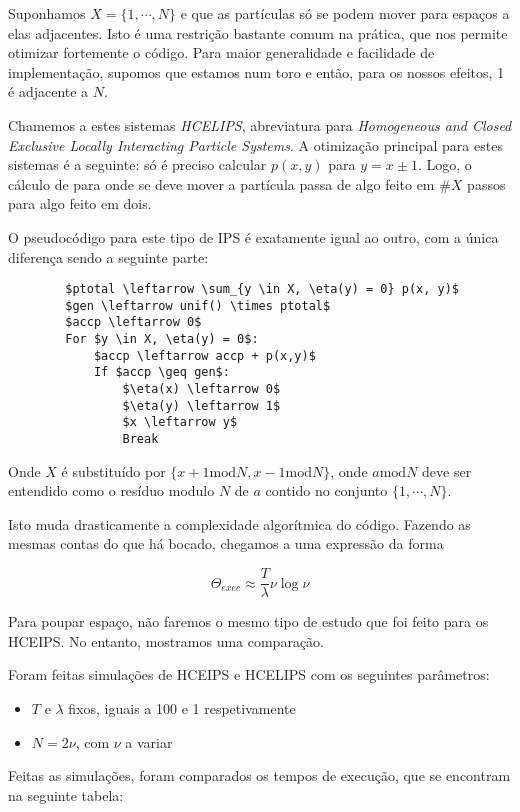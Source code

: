 \documentclass{article}
\renewcommand{\mod}{\mathbin{\mathrm{mod}}}
\begin{document}
	Suponhamos $X = \{1,\cdots, N\}$ e que as partículas só se podem mover para espaços a elas adjacentes. Isto é uma restrição bastante comum na prática, que nos permite otimizar fortemente o código. Para maior generalidade e facilidade de implementação, supomos que estamos num toro e então, para os nossos efeitos, 1 é adjacente a $N$.
	
	Chamemos a estes sistemas \emph{HCELIPS}, abreviatura para \emph{Homogeneous and Closed Exclusive Locally Interacting Particle Systems}. A otimização principal para estes sistemas é a seguinte: só é preciso calcular $p(x,y)$ para $y = x \pm 1$. Logo, o cálculo de para onde se deve mover a partícula passa de algo feito em $\#X$ passos para algo feito em dois.
	
	O pseudocódigo para este tipo de IPS é exatamente igual ao outro, com a única diferença sendo a seguinte parte:
	
	\begin{lstlisting}
		$ptotal \leftarrow \sum_{y \in X, \eta(y) = 0} p(x, y)$
		$gen \leftarrow unif() \times ptotal$
		$accp \leftarrow 0$
		For $y \in X, \eta(y) = 0$:
			$accp \leftarrow accp + p(x,y)$
			If $accp \geq gen$:
				$\eta(x) \leftarrow 0$
				$\eta(y) \leftarrow 1$
				$x \leftarrow y$
				Break
	\end{lstlisting}
	
	Onde $X$ é substituído por $\{x+1 \mod N, x-1 \mod N\}$, onde $a \mod N$ deve ser entendido como o resíduo modulo $N$ de $a$ contido no conjunto $\{1, \cdots, N\}$.
	
	Isto muda drasticamente a complexidade algorítmica do código. Fazendo as mesmas contas do que há bocado, chegamos a uma expressão da forma
	
	\[\Theta_{exec} \approx \frac T \lambda \nu \log \nu\]
	
	Para poupar espaço, não faremos o mesmo tipo de estudo que foi feito para os HCEIPS. No entanto, mostramos uma comparação.
	
	Foram feitas simulações de HCEIPS e HCELIPS com os seguintes parâmetros:
	
	\begin{itemize}
	\item $T$ e $\lambda$ fixos, iguais a 100 e 1 respetivamente
	
	\item $N = 2 \nu$, com $\nu$ a variar
	\end{itemize}
	
	Feitas as simulações, foram comparados os tempos de execução, que se encontram na seguinte tabela:
	
\end{document}
